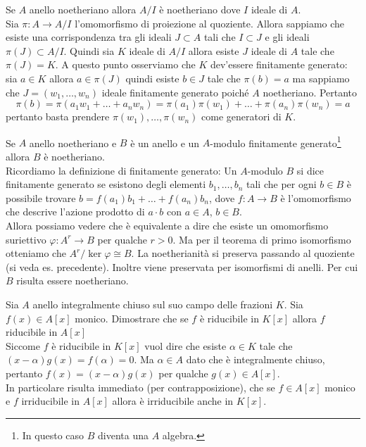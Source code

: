 \begin{esercizio}
	Se $A$ anello noetheriano allora $A/I$ è noetheriano dove $I$ ideale di $A$.\\
	
	Sia $\pi \colon A \to A/I$ l'omomorfismo di proiezione al quoziente.
	Allora sappiamo che esiste una corrispondenza tra gli ideali $J \subset A$ tali
	che $I \subset J$ e gli ideali $\pi(J) \subset A/I$. 
	Quindi sia $K$ ideale di $A/I$ allora esiste $J$ ideale di $A$ tale che 
	$\pi(J) = K$. A questo punto osserviamo che $K$ dev'essere finitamente generato:
	sia $a \in K$ allora $a \in \pi(J)$ quindi esiste $b \in J$ tale che $\pi(b) =a$
	ma sappiamo che $J = (w_1, \dots, w_n)$ ideale finitamente generato poiché $A$ noetheriano. Pertanto 
	\begin{equation*}
		\pi(b) = \pi(a_1 w_1 + \dots + a_n w_n) = \pi(a_1) \pi(w_1) + \dots + 
					\pi(a_n)\pi(w_n) = a
	\end{equation*}     
 	pertanto basta prendere $\pi(w_1), \dots, \pi(w_n)$ come 
 	generatori di $K$. 
\end{esercizio}

\begin{esercizio}
	Se $A$ anello noetheriano e $B$ è un anello e un $A$-modulo finitamente generato\footnote{In questo caso $B$ diventa una $A$ algebra.} allora $B$ è noetheriano.\\
	
	Ricordiamo la definizione di finitamente generato:
	Un $A$-modulo $B$ si dice finitamente generato se esistono 
	degli elementi $b_1, \dots, b_n$ tali che per ogni $b \in B$ è possibile trovare $b = f(a_1)b_1 + \dots + f(a_n)b_n$, dove $f \colon A \to B$ è l'omomorfismo che
	descrive l'azione prodotto di $a\cdot b$ con $a\in A$, $b\in B$.\\
	
	Allora possiamo vedere che è equivalente a dire che esiste
	un omomorfismo suriettivo $\varphi \colon A^r \to B$ per 
	qualche $r > 0$. Ma per il teorema di primo isomorfismo
	otteniamo che $A^r/\ker \varphi \cong B$. La noetherianità 
	si preserva passando al quoziente (si veda es. 
	precedente). Inoltre viene preservata per isomorfismi di
	anelli. Per cui $B$ risulta essere noetheriano. 
\end{esercizio}

\begin{esercizio}
	Sia $A$ anello integralmente chiuso sul suo campo delle frazioni $K$. Sia $f(x) \in A[x]$ monico. 
	Dimostrare che se $f$ è riducibile in $K[x]$ allora $f$ riducibile in $A[x]$\\
	
	Siccome $f$ è riducibile in $K[x]$ vuol dire che esiste $\alpha \in K$ tale che $(x-\alpha)g(x) = f(\alpha) = 0$. Ma $\alpha \in A$ 
	dato che è integralmente chiuso, pertanto $f(x) = (x-\alpha)g(x)$ per qualche $g(x) \in A[x]$.\\ 
	
	In particolare risulta immediato (per contrapposizione), 
	che se $f \in A[x]$ monico e $f$ irriducibile in $A[x]$
	allora è irriducibile anche in $K[x]$. 
\end{esercizio}

